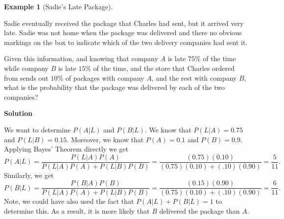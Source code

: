 \documentclass[
  letterpaper,
  DIV=11,
  numbers=noendperiod]{scrreprt}
\theoremstyle{definition}
\theoremstyle{definition}
\newtheorem{example}{Example}[chapter]
\theoremstyle{definition}
\theoremstyle{remark}
\begin{document}
\begin{example}[Sadie's Late
Package]\protect\hypertarget{exm-bayes-theorem}{}\label{exm-bayes-theorem}

Sadie eventually received the package that Charles had sent, but it
arrived very late. Sadie was not home when the package was delivered and
there no obvious markings on the box to indicate which of the two
delivery companies had sent it.

Given this information, and knowing that company \(A\) is late \(75\%\)
of the time while company \(B\) is late \(15\%\) of the time, and the
store that Charles ordered from sends out \(10\%\) of packages with
company \(A\), and the rest with company \(B\), what is the probability
that the package was delivered by each of the two companies?

\begin{tcolorbox}[enhanced jigsaw, colback=white, colframe=quarto-callout-color-frame, arc=.35mm, leftrule=.75mm, rightrule=.15mm, opacityback=0, breakable, bottomrule=.15mm, left=2mm, toprule=.15mm]

\vspace{-3mm}\textbf{Solution}\vspace{3mm}

We want to determine \(P(A|L)\) and \(P(B|L)\). We know that
\(P(L|A) = 0.75\) and \(P(L|B) = 0.15\). Moreover, we know that
\(P(A) = 0.1\) and \(P(B) = 0.9\). Applying Bayes' Theorem directly we
get
\[P(A|L) = \frac{P(L|A)P(A)}{P(L|A)P(A) + P(L|B)P(B)} = \frac{(0.75)(0.10)}{(0.75)(0.10) + (.10)(0.90)} = \frac{5}{11}.\]
Similarly, we get
\[P(B|L) = \frac{P(B|A)P(B)}{P(L|A)P(A) + P(L|B)P(B)} = \frac{(0.15)(0.90)}{(0.75)(0.10) + (.10)(0.90)} = \frac{6}{11}.\]
Note, we could have also used the fact that \(P(A|L) + P(B|L) = 1\) to
determine this. As a result, it is more likely that \(B\) delivered the
package than \(A\).\footnotemark{}

\end{tcolorbox}


\end{example}
\end{document}
